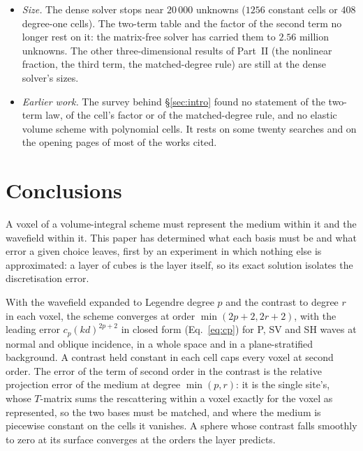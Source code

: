 \documentclass[11pt,a4paper]{article}
\begin{document}
\begin{itemize}
cells to $3\%$, on grids to $2.3$ million unknowns. What a tree saves
(Tables~\ref{tab:treesolved} and \ref{tab:treesfree}): for constant cells a factor of up to three in
cells at $2200$ leaves and of four at $16\,000$ on the sharp sphere, the larger trees by a matrix-free
product that agrees with the dense solver where both run. Trees of degree-one cells on the sharp sphere
(Table~\ref{tab:treesdeg1}): at equal unknowns they hold the surface as well as constant trees and no
better, and gain a factor of up to $3.5$ through the first-order error alone. Not established: trees of
the smooth bodies beyond the dense solver, and a body without radial symmetry.
\item \emph{Size.} The dense solver stops near $20\,000$ unknowns ($1256$ constant cells or $408$
degree-one cells). The two-term table and the factor of the second term no longer rest on it: the
matrix-free solver has carried them to $2.56$ million unknowns. The other three-dimensional results of
Part~II (the nonlinear fraction, the third term, the matched-degree rule) are still at the dense solver's
sizes.
\item \emph{Earlier work.} The survey behind \S\ref{sec:intro} found no statement of the two-term law,
of the cell's factor or of the matched-degree rule, and no elastic volume scheme with polynomial cells.
It rests on some twenty searches and on the opening pages of most of the works cited.
\end{itemize}


\section{Conclusions}\label{sec:summary}

A voxel of a volume-integral scheme must represent the medium within it and the wavefield within it.
This paper has determined what each basis must be and what error a given choice leaves, first by an
experiment in which nothing else is approximated: a layer of cubes is the layer itself, so its exact
solution isolates the discretisation error.

With the wavefield expanded to Legendre degree $p$ and the contrast to degree $r$ in each voxel, the
scheme converges at order $\min(2p+2,2r+2)$, with the leading error $c_p(kd)^{2p+2}$ in closed form
(Eq.~\eqref{eq:cp}) for P, SV and SH waves at normal and oblique incidence, in a whole space and in a
plane-stratified background. A contrast held constant in each cell caps every voxel at second order.
The error of the term of second order in the contrast is the relative projection error of the medium at
degree $\min(p,r)$: it is the single site's, whose $T$-matrix sums the rescattering within a voxel
exactly for the voxel as represented, so the two bases must be matched, and where the medium is
piecewise constant on the cells it vanishes. A sphere whose contrast falls smoothly to zero at its
surface converges at the orders the layer predicts.
\end{document}
